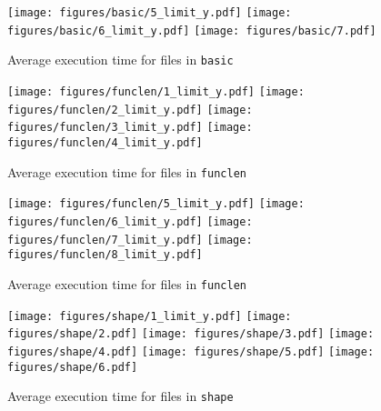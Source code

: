 \documentclass[12pt,dvipsnames]{article}
\newcommand{\mono}[1]{\texttt{#1}}
\begin{document}
\begin{figure}[ht]
    \centering
    \texttt{[image: figures/basic/5\_limit\_y.pdf]}
    \texttt{[image: figures/basic/6\_limit\_y.pdf]}
    \texttt{[image: figures/basic/7.pdf]}
    \caption{Average execution time for files in \mono{basic} }
    \label{fig:results_basic_b}
\end{figure}

\begin{figure}[ht]
    \centering
    \texttt{[image: figures/funclen/1\_limit\_y.pdf]}
    \texttt{[image: figures/funclen/2\_limit\_y.pdf]}
    \texttt{[image: figures/funclen/3\_limit\_y.pdf]}
    \texttt{[image: figures/funclen/4\_limit\_y.pdf]}
    \caption{Average execution time for files in \mono{funclen} }
    \label{fig:results_funclenc_a}
\end{figure}

\begin{figure}[ht]
    \centering
    \texttt{[image: figures/funclen/5\_limit\_y.pdf]}
    \texttt{[image: figures/funclen/6\_limit\_y.pdf]}
    \texttt{[image: figures/funclen/7\_limit\_y.pdf]}
    \texttt{[image: figures/funclen/8\_limit\_y.pdf]}
    \caption{Average execution time for files in \mono{funclen} }
    \label{fig:results_funclen_a}
\end{figure}

\begin{figure}[ht]
    \centering
    \texttt{[image: figures/shape/1\_limit\_y.pdf]}
    \texttt{[image: figures/shape/2.pdf]}
    \texttt{[image: figures/shape/3.pdf]}
    \texttt{[image: figures/shape/4.pdf]}
    \texttt{[image: figures/shape/5.pdf]}
    \texttt{[image: figures/shape/6.pdf]}
    \caption{Average execution time for files in \mono{shape} }
    \label{fig:results_shape}
\end{figure}
\end{document}
